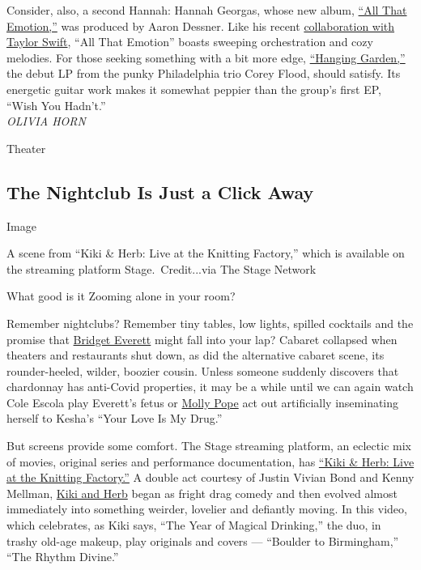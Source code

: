 Consider, also, a second Hannah: Hannah Georgas, whose new album,
\href{https://hannahgeorgas.bandcamp.com/album/all-that-emotion}{``All
That Emotion,''} was produced by Aaron Dessner. Like his recent
\href{https://www.nytimes3xbfgragh.onion/2020/07/26/arts/music/taylor-swift-folklore-review.html}{collaboration
with Taylor Swift}, ``All That Emotion'' boasts sweeping orchestration
and cozy melodies. For those seeking something with a bit more edge,
\href{https://coreyflood.bandcamp.com/album/hanging-garden}{``Hanging
Garden,''} the debut LP from the punky Philadelphia trio Corey Flood,
should satisfy. Its energetic guitar work makes it somewhat peppier than
the group's first EP, ``Wish You Hadn't.''\\
\emph{OLIVIA HORN}

Theater

\hypertarget{the-nightclub-is-just-a-click-away}{%
\subsection{The Nightclub Is Just a Click
Away}\label{the-nightclub-is-just-a-click-away}}

Image

A scene from ``Kiki \& Herb: Live at the Knitting Factory,'' which is
available on the streaming platform Stage.~Credit...via The Stage
Network

What good is it Zooming alone in your room?

Remember nightclubs? Remember tiny tables, low lights, spilled cocktails
and the promise that \href{http://www.bridgeteverett.net/}{Bridget
Everett} might fall into your lap? Cabaret collapsed when theaters and
restaurants shut down, as did the alternative cabaret scene, its
rounder-heeled, wilder, boozier cousin. Unless someone suddenly
discovers that chardonnay has anti-Covid properties, it may be a while
until we can again watch Cole Escola play Everett's fetus or
\href{https://www.nytimes3xbfgragh.onion/2015/02/15/theater/for-molly-pope-adventures-in-cabaret-and-horseplay.html}{Molly
Pope} act out artificially inseminating herself to Kesha's ``Your Love
Is My Drug.''

But screens provide some comfort. The Stage streaming platform, an
eclectic mix of movies, original series and performance documentation,
has
\href{https://www.watchstage.com/programs/kiki-herb-live-at-the-knitting-factory}{``Kiki
\& Herb: Live at the Knitting Factory.''} A double act courtesy of
Justin Vivian Bond and Kenny Mellman,
\href{https://www.nytimes3xbfgragh.onion/2016/04/17/arts/music/kiki-and-herb-kitsch-with-a-whisky-chaser.html}{Kiki
and Herb} began as fright drag comedy and then evolved almost
immediately into something weirder, lovelier and defiantly moving. In
this video, which celebrates, as Kiki says, ``The Year of Magical
Drinking,'' the duo, in trashy old-age makeup, play originals and covers
--- ``Boulder to Birmingham,'' ``The Rhythm Divine.''

